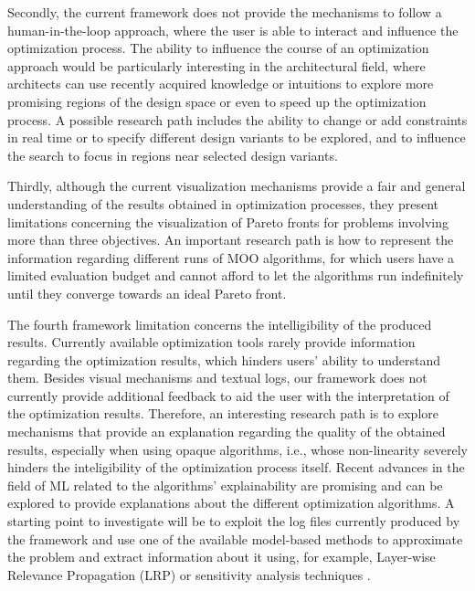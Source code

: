Secondly, the current framework does not provide the mechanisms to follow a human-in-the-loop approach, where the user is able to interact and influence the optimization process. The ability to influence the course of an optimization approach would be particularly interesting in the architectural field, where architects can use recently acquired knowledge or intuitions to explore more promising regions of the design space or even to speed up the optimization process. A possible research path includes the ability to change or add constraints in real time or to specify different design variants to be explored, and to influence the search to focus in regions near selected design variants. %

Thirdly, although the current visualization mechanisms provide a fair and general understanding of the results obtained in optimization processes, they present limitations concerning the visualization of Pareto fronts for problems involving more than three objectives. An important research path is how to represent the information regarding different runs of \ac{MOO} algorithms, for which users have a limited evaluation budget and cannot afford to let the algorithms run indefinitely until they converge towards an ideal Pareto front. %

The fourth framework limitation concerns the intelligibility of the produced results. Currently available optimization tools rarely provide information regarding the optimization results, which hinders users' ability to understand them. Besides visual mechanisms and textual logs, our framework does not currently provide additional feedback to aid the user with the interpretation of the optimization results. Therefore, an interesting research path is to explore mechanisms that provide an explanation regarding the quality of the obtained results, especially when using opaque algorithms, i.e., whose non-linearity severely hinders the inteligibility of the optimization process itself. Recent advances in the field of \ac{ML} related to the algorithms' explainability are promising and can be explored to provide explanations about the different optimization algorithms. A starting point to investigate will be to exploit the log files currently produced by the framework and use one of the available model-based methods to approximate the problem and extract information about it using, for example, Layer-wise Relevance Propagation (LRP) or sensitivity analysis techniques \cite{Bach2015,Tripathy2018}.

